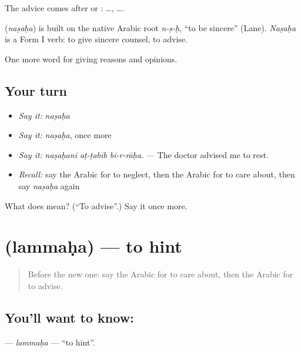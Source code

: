 The advice comes after  or :   …,   ….

\begin{cousinweb}
\textbf{} (\emph{naṣaḥa}) is built on the native Arabic root \emph{n-ṣ-ḥ}, \textquotedblleft{}to be sincere\textquotedblright{} (Lane). \emph{Naṣaḥa} is a Form I verb: to give sincere counsel, to advise.
\end{cousinweb}

\begin{grammarlens}[title={What you've built}]
One more word for giving reasons and opinions.
\end{grammarlens}

\subsection*{Your turn}
\begin{itemize}
\raggedright
  \item \emph{Say it:} \emph{naṣaḥa}
  \item \emph{Say it:} \emph{naṣaḥa}, once more
  \item \emph{Say it:} \emph{naṣaḥanī aṭ-ṭabīb bi-r-rāḥa.} — The doctor advised me to rest.
  \item \emph{Recall:} say the Arabic for to neglect, then the Arabic for to care about, then say \emph{naṣaḥa} again
\end{itemize}

\begin{tcolorbox}[breakable,colback=teal!4,colframe=teal!35!black,title={Before you move on}]
What does  mean? (\textquotedblleft{}To advise\textquotedblright{}.) Say it once more.
\end{tcolorbox}
\section[\texorpdfstring{\ar{لمح} (lammaḥa)}{لمح (lammaḥa)}]{ (lammaḥa) — to hint}

\label{lesson:AR-C369-lammaha}



\begin{quote}
Before the new one: say the Arabic for to care about, then the Arabic for to advise.
\end{quote}

\subsection*{You'll want to know: }
\textbf{} — \emph{lammaḥa} — \textquotedblleft{}to hint\textquotedblright{}.

